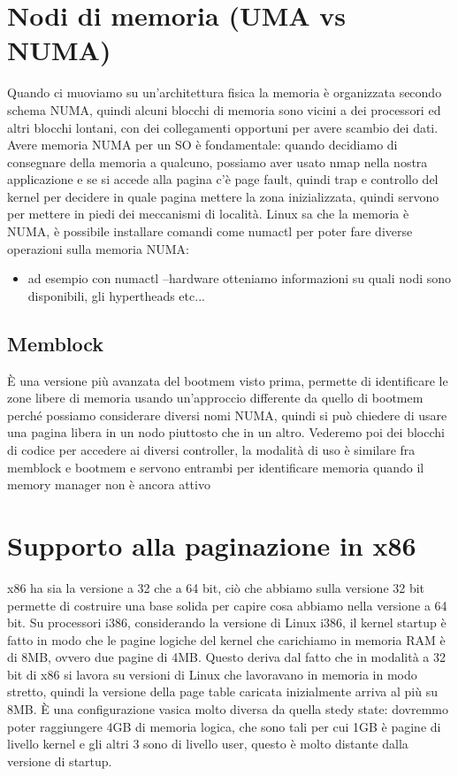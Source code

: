 \documentclass[12pt, oneside]{extbook}
\begin{document}
\section{Nodi di memoria (UMA vs NUMA)}
Quando ci muoviamo su un'architettura fisica la memoria è organizzata secondo schema NUMA, quindi alcuni blocchi di memoria sono vicini a dei processori ed altri blocchi lontani, con dei collegamenti opportuni per avere scambio dei dati. Avere memoria NUMA per un SO è fondamentale: quando decidiamo di consegnare della memoria a qualcuno, possiamo aver usato nmap nella nostra applicazione e se si accede alla pagina c'è page fault, quindi trap e controllo del kernel per decidere in quale pagina mettere la zona inizializzata, quindi servono per mettere in piedi dei meccanismi di località. Linux sa che la memoria è NUMA, è possibile installare comandi come \textsf{numactl} per poter fare diverse operazioni sulla memoria NUMA:
\begin{itemize}
\item ad esempio con \textsf{numactl --hardware} otteniamo informazioni su quali nodi sono disponibili, gli hypertheads etc...
\end{itemize}
\subsection{Memblock}
È una versione più avanzata del bootmem visto prima, permette di identificare le zone libere di memoria usando un'approccio differente da quello di bootmem perché possiamo considerare diversi nomi NUMA, quindi si può chiedere di usare una pagina libera in un nodo piuttosto che in un altro. Vederemo poi dei blocchi di codice per accedere ai diversi controller, la modalità di uso è similare fra memblock e bootmem e servono entrambi per identificare memoria quando il memory manager non è ancora attivo
\section{Supporto alla paginazione in x86}
x86 ha sia la versione a 32 che a 64 bit, ciò che abbiamo sulla versione 32 bit permette di costruire una base solida per capire cosa abbiamo nella versione a 64 bit. Su processori i386, considerando la versione di Linux i386, il kernel startup è fatto in modo che le pagine logiche del kernel che carichiamo in memoria RAM è di 8MB, ovvero due pagine di 4MB. Questo deriva dal fatto che in modalità a 32 bit di x86 si lavora su versioni di Linux che lavoravano in memoria in modo stretto, quindi la versione della page table caricata inizialmente arriva al più su 8MB. È una configurazione vasica molto diversa da quella stedy state: dovremmo poter raggiungere 4GB di memoria logica, che sono tali per cui 1GB è pagine di livello kernel e gli altri 3 sono di livello user, questo è molto distante dalla versione di startup.
\end{document}
